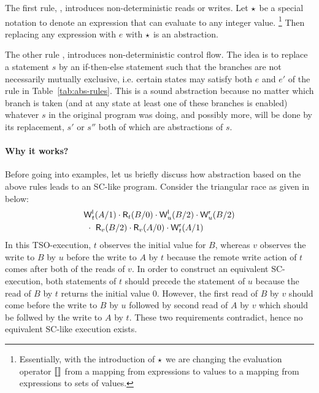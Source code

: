
The first rule, {}, introduces non-deterministic reads or writes.
Let $\star$ be a special notation to denote an expression that can evaluate to any integer value.
\footnote{Essentially, with the introduction of $\star$ we are changing the evaluation operator $\llbracket \rrbracket$ from a mapping from expressions to values to a mapping from expressions to sets of values.}
Then replacing any expression with $e$ with $\star$ is an abstraction.

The other rule {}, introduces non-deterministic control flow.
The idea is to replace a statement $s$ by an if-then-else statement such that the branches are not necessarily mutually exclusive, i.e. certain states may satisfy both $e$ and $e'$ of the rule in Table~\ref{tab:abs-rules}.
This is a sound abstraction because no matter which branch is taken (and at any state at least one of these branches is enabled) whatever $s$ in the original program was doing, and possibly more, will be done by its replacement, $s'$ or $s''$ both of which are abstractions of $s$.  

\paragraph{Why it works?}
Before going into examples, let us briefly discuss how abstraction based on the above rules leads to an SC-like program. 
Consider the triangular race as given in~\cite{Owe2010} below:
{\small
\begin{eqnarray*}
&\mathsf{W}^{\mathsf{l}}_{t}(A/1) \cdot \mathsf{R}_{t}(B/0) \cdot \mathsf{W}^{\mathsf{l}}_{u}(B/2) \cdot \mathsf{W}^{\mathsf{r}}_{u}(B/2)\\
&\ \cdot\ \mathsf{R}_{v}(B/2) \cdot \mathsf{R}_{v}(A/0) \cdot \mathsf{W}^{\mathsf{r}}_{t}(A/1)
\end{eqnarray*}
}
In this TSO-execution, $t$ observes the initial value for $B$, whereas $v$ observes the write to $B$ by $u$ before the write to $A$ by $t$ because the remote write action of $t$ comes after both of the reads of $v$.
In order to construct an equivalent SC-execution, both statements of $t$ should precede the statement of $u$ because the read of $B$ by $t$ returns the initial value 0.
However, the first read of $B$ by $v$ should come before the write to $B$ by $u$ followed by second read of $A$ by $v$ which should be follwed by the write to $A$ by $t$.
These two requirements contradict, hence no equivalent SC-like execution exists.

